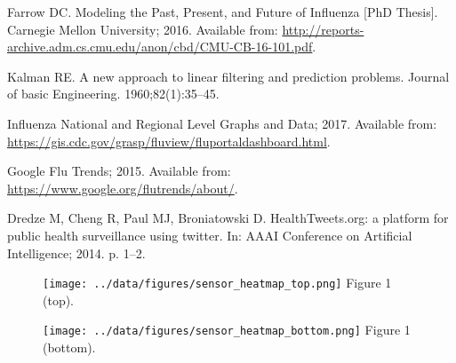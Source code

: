 \documentclass[10pt,letterpaper]{article}
\begin{document}
\begin{thebibliography}{10}
Farrow DC.
\newblock Modeling the Past, Present, and Future of Influenza [PhD Thesis].
\newblock Carnegie Mellon University; 2016.
\newblock Available from:
  \url{http://reports-archive.adm.cs.cmu.edu/anon/cbd/CMU-CB-16-101.pdf}.

Kalman RE.
\newblock A new approach to linear filtering and prediction problems.
\newblock Journal of basic Engineering. 1960;82(1):35--45.

Influenza National and Regional Level Graphs and Data; 2017.
\newblock Available from:
  \url{https://gis.cdc.gov/grasp/fluview/fluportaldashboard.html}.

Google Flu Trends; 2015.
\newblock Available from: \url{https://www.google.org/flutrends/about/}.

Dredze M, Cheng R, Paul MJ, Broniatowski D.
\newblock HealthTweets.org: a platform for public health surveillance using
  twitter.
\newblock In: AAAI Conference on Artificial Intelligence; 2014. p. 1--2.

\end{thebibliography}

\begin{figure}[p]
  \texttt{[image: ../data/figures/sensor\_heatmap\_top.png]}
  Figure 1 (top).
\end{figure}
\begin{figure}[p]
  \texttt{[image: ../data/figures/sensor\_heatmap\_bottom.png]}
  Figure 1 (bottom).
\end{figure}
\end{document}
